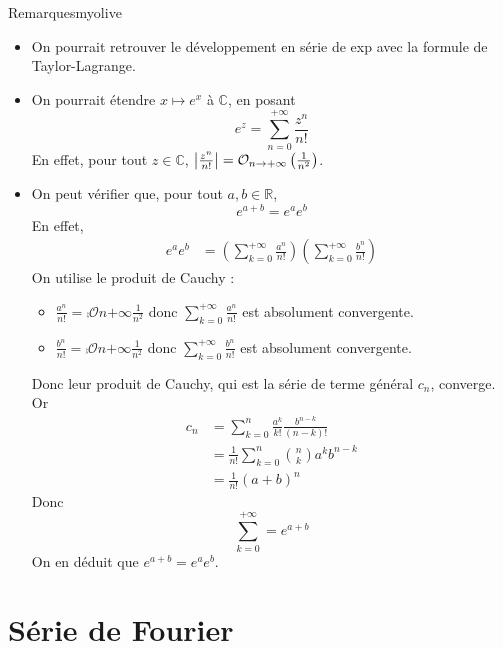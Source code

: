     \begin{omed}{Remarques}{myolive}
        \begin{itemize}
            \item On pourrait retrouver le développement en série de exp avec la formule de Taylor-Lagrange.
            \item On pourrait étendre $x \mapsto e^x$ à $\mathbb{C}$, en posant 
            \[ e^z = \sum_{n=0}^{+\infty} \frac{z^n}{n!} \]
            En effet, pour tout $z \in \mathbb{C}$, $\left\lvert \frac{z^n}{n!}\right\rvert = \mathcal{O}_{n \rightarrow +\infty} \left(\frac{1}{n^2}\right)$.
            \item On peut vérifier que, pour tout $a,b \in \mathbb{R}$, 
            \[ e^{a+b} = e^a e^b \] 
            En effet, 
            \begin{align*}
                e^a e^b 
                &= \left( \sum_{k=0}^{+\infty} \frac{a^n}{n!}  \right) \left( \sum_{k=0}^{+\infty} \frac{b^n}{n!} \right)
            \end{align*}
            On utilise le produit de Cauchy :
            \begin{itemize}
                \item $\frac{a^n}{n!} = \comp{\mathcal{O}}{n}{+\infty}{\frac{1}{n^2}}$ donc $\sum_{k=0}^{+\infty} \frac{a^n}{n!}$ est absolument convergente.
                \item $\frac{b^n}{n!} = \comp{\mathcal{O}}{n}{+\infty}{\frac{1}{n^2}}$ donc $\sum_{k=0}^{+\infty} \frac{b^n}{n!}$ est absolument convergente.
            \end{itemize}
            Donc leur produit de Cauchy, qui est la série de terme général $c_n$, converge. Or 
            \begin{align*}
                c_n 
                &= \sum_{k=0}^{n} \frac{a^k}{k!} \frac{b^{n-k}}{(n-k)!} \\
                &= \frac{1}{n!} \sum_{k=0}^{n} \binom{n}{k} a^k b^{n-k} \\
                &= \frac{1}{n!} (a+b)^n 
            \end{align*}
            Donc \[ \sum_{k=0}^{+\infty} = e^{a+b} \]   
            On en déduit que $e^{a+b} = e^a e^b$.
        \end{itemize}
    \end{omed}

\section{Série de Fourier}

